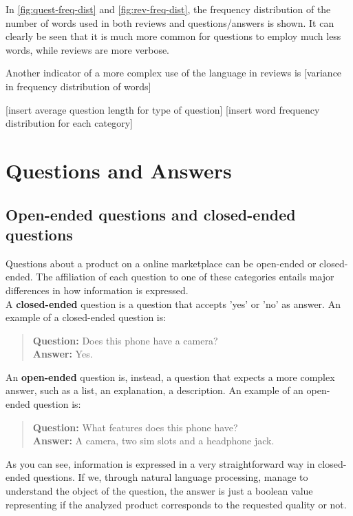 \documentclass[LaM,binding=0.6cm]{sapthesis}
\begin{document}
In \ref{fig:quest-freq-dist} and \ref{fig:rev-freq-dist}, the frequency distribution of the number of words used in both reviews and questions/answers is shown. It can clearly be seen that it is much more common for questions to employ much less words, while reviews are more verbose.

Another indicator of a more complex use of the language in reviews is [variance in frequency distribution of words]

[insert average question length for type of question]
[insert word frequency distribution for each category]

\section{Questions and Answers}

\subsection{Open-ended questions and closed-ended questions}

Questions about a product on a online marketplace can be open-ended or closed-ended. The affiliation of each question to one of these categories entails major differences in how information is expressed. \\

A \textbf{closed-ended} question is a question that accepts 'yes' or 'no' as answer. An example of a closed-ended question is:
\begin{quote}
\textbf{Question:} Does this phone have a camera? \\
\textbf{Answer:} Yes.
\end{quote} 

An \textbf{open-ended} question is, instead, a question that expects a more complex answer, such as a list, an explanation, a description. An example of an open-ended question is:
\begin{quote}
\textbf{Question:} What features does this phone have? \\
\textbf{Answer:} A camera, two sim slots and a headphone jack.
\end{quote}

As you can see, information is expressed in a very straightforward way in closed-ended questions. If we, through natural language processing, manage to understand the object of the question, the answer is just a boolean value representing if the analyzed product corresponds to the requested quality or not.
\end{document}
